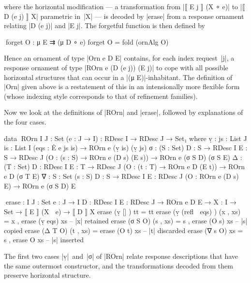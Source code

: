 where the horizontal modification --- a transformation from |⟦ E j ⟧ (X ∘ e)| to |⟦ D (e j) ⟧ X| parametric in~|X| --- is decoded by |erase| from a response ornament relating |D (e j)| and |E j|.
The forgetful function is then defined by
\begin{code}
^^^forget O : μ E ⇉ (μ D ∘ e)
forget O = fold (ornAlg O)
\end{code}
Hence an ornament of type |Orn e D E| contains, for each index request~|j|, a response ornament of type |ROrn e (D (e j)) (E j)| to cope with all possible horizontal structures that can occur in a |(μ E)|-inhabitant.
The definition of |Orn| given above is a restatement of this in an intensionally more flexible form (whose indexing style corresponds to that of refinement families).

Now we look at the definitions of |ROrn| and |erase|, followed by explanations of the four cases.
\begin{code}
data ^^^ROrn {I J : Set} (e : J → I) : RDesc I → RDesc J → Set₁ where
  ṿ   :  {js : List J} {is : List I} (eqs : Ė e js is) → ROrn e (ṿ is) (ṿ js)
  σ   :  (S : Set) {D : S → RDesc I} {E : S → RDesc J}
         (O : (s : S) → ROrn e (D s) (E s)) → ROrn e (σ S D) (σ S E)
  Δ   :  (T : Set) {D : RDesc I} {E : T → RDesc J}
         (O : (t : T) → ROrn e D (E t)) → ROrn e D (σ T E)
  ∇   :  {S : Set} (s : S) {D : S → RDesc I} {E : RDesc J}
         (O : ROrn e (D s) E) → ROrn e (σ S D) E
           
^^^erase :  {I J : Set} {e : J → I} {D : RDesc I} {E : RDesc J} →
            ROrn e D E → {X : I → Set} → ⟦ E ⟧ (X ∘ e) → ⟦ D ⟧ X
erase (ṿ []            )  tt         = tt
erase (ṿ (refl ∷ eqs)  )  (x ,  xs)  = x  ,  erase (ṿ eqs)  xs  -- |x| retained
erase (σ S O)             (s ,  xs)  = s  ,  erase (O s)    xs  -- |s| copied
erase (Δ T O)             (t ,  xs)  =       erase (O t)    xs  -- |t| discarded
erase (∇ s O)                   xs   = s  ,  erase O        xs  -- |s| inserted
\end{code}
The first two cases |ṿ|~and~|σ| of |ROrn| relate response descriptions that have the same outermost constructor, and the transformations decoded from them preserve horizontal structure.
